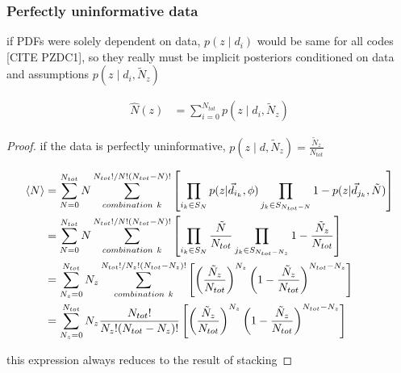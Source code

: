 
\subsubsection{Perfectly uninformative data}
\label{sec:prior}

\begin{theorem}
if PDFs were solely dependent on data, $p(z \mid d_{i})$ would be same for all codes [CITE PZDC1], so they really must be implicit posteriors conditioned on data and assumptions $p(z \mid d_{i}, \tilde{N}_{z})$

\begin{align}
\label{eq:stackwithprior}
\hat{N}(z) &= \sum_{i = 0}^{N_{tot}} p(z \mid d_{i}, \tilde{N}_{z})
\end{align}
\end{theorem}
\begin{proof}
if the data is perfectly uninformative, $p(z \mid d, \tilde{N}_{z}) = \frac{\tilde{N}_{z}}{N_{tot}}$

\begin{align}
\label{eq:prior}
\langle N \rangle &= \sum_{N = 0}^{N_{tot}} N \sum_{combination\ k}^{N_{tot}! / N! (N_{tot} - N)!} \left[ \prod_{i_{k} \in S_{N}} p(z \gvn \data_{i_{k}}, \phi) \prod_{j_{k} \in S_{N_{tot} - N}} 1 - p(z \gvn \data_{j_{k}}, \tilde{N}) \right]\\
&= \sum_{N = 0}^{N_{tot}} N \sum_{combination\ k}^{N_{tot}! / N! (N_{tot} - N)!} \left[ \prod_{i_{k} \in S_{N}} \frac{\tilde{N}}{N_{tot}} \prod_{j_{k} \in S_{N_{tot} - N_{z}}} 1 - \frac{\tilde{N}_{z}}{N_{tot}} \right]\\
&= \sum_{N_{z} = 0}^{N_{tot}} N_{z} \sum_{combination\ k}^{N_{tot}! / N_{z}! (N_{tot} - N_{z})!} \left[ \left(\frac{\tilde{N}_{z}}{N_{tot}}\right)^{N_{z}} \left(1 - \frac{\tilde{N}_{z}}{N_{tot}}\right)^{N_{tot}-N_{z}} \right]\\
&= \sum_{N_{z} = 0}^{N_{tot}} N_{z} \frac{N_{tot}!}{N_{z}! (N_{tot} - N_{z})!} \left[ \left(\frac{\tilde{N}_{z}}{N_{tot}}\right)^{N_{z}} \left(1 - \frac{\tilde{N}_{z}}{N_{tot}}\right)^{N_{tot}-N_{z}} \right]\\
\end{align}

this expression always reduces to the result of stacking
\end{proof}

